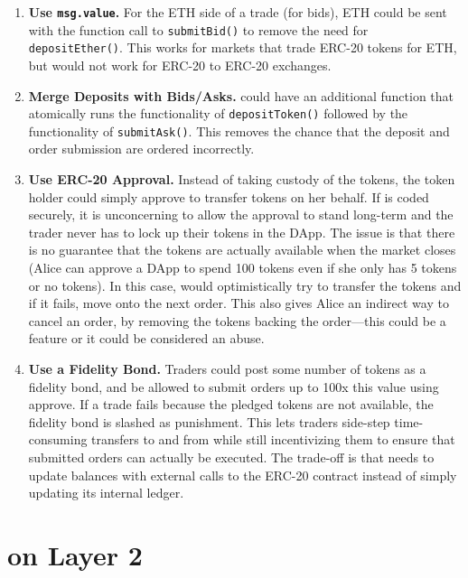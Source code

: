 \begin{enumerate}

\item \textbf{Use \texttt{msg.value}.} For the ETH side of a trade (\ie for bids), ETH could be sent with the function call to \texttt{submitBid()} to remove the need for    \texttt{depositEther()}. This works for markets that trade ERC-20 tokens for ETH, but would not work for ERC-20 to ERC-20 exchanges. 

\item \textbf{Merge Deposits with Bids/Asks.} \cm could have an additional function that atomically runs the functionality of \texttt{depositToken()} followed by the functionality of \texttt{submitAsk()}. This removes the chance that the deposit and order submission are ordered incorrectly.

\item \textbf{Use ERC-20 Approval.} Instead of \cm taking custody of the tokens, the token holder could simply approve \cm to transfer tokens on her behalf. If \cm is coded securely, it is unconcerning to allow the approval to stand long-term and the trader never has to lock up their tokens in the DApp. The issue is that there is no guarantee that the tokens are actually available when the market closes (\ie Alice can approve a DApp to spend 100 tokens even if she only has 5 tokens or no tokens). In this case, \cm would optimistically try to transfer the tokens and if it fails, move onto the next order. This also gives Alice an indirect way to cancel an order, by removing the tokens backing the order---this could be a feature or it could be considered an abuse.

\item \textbf{Use a Fidelity Bond.} Traders could post some number of tokens as a fidelity bond, and be allowed to submit orders up to 100x this value using approve. If a trade fails because the pledged tokens are not available, the fidelity bond is slashed as punishment. This lets traders side-step time-consuming transfers to and from \cm while still incentivizing them to ensure that submitted orders can actually be executed. The trade-off  is that \cm needs to update balances with external calls to the ERC-20 contract instead of simply updating its internal ledger. 

\end{enumerate}


\section{\cm on Layer 2}\label{sec:rollups}

